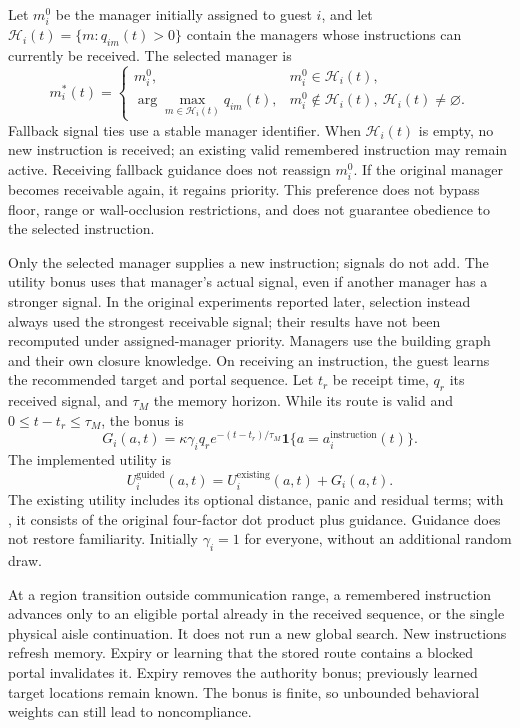 \documentclass[11pt]{article}
\newcommand{\ind}{\mathbf{1}}
\newcommand{\code}[1]{\texttt{\detokenize{#1}}}
\begin{document}
Let $m_i^0$ be the manager initially assigned to guest $i$, and let
$\mathcal H_i(t)=\{m:q_{im}(t)>0\}$ contain the managers whose instructions
can currently be received. The selected manager is
\[
 m_i^*(t)=
 \begin{cases}
 m_i^0,&m_i^0\in\mathcal H_i(t),\\
 \displaystyle\arg\max_{m\in\mathcal H_i(t)}q_{im}(t),
       &m_i^0\notin\mathcal H_i(t),\ \mathcal H_i(t)\ne\varnothing.
 \end{cases}
\]
Fallback signal ties use a stable manager identifier. When $\mathcal H_i(t)$
is empty, no new instruction is received; an existing valid remembered
instruction may remain active. Receiving fallback guidance does not reassign
$m_i^0$. If the original manager becomes receivable again, it regains priority.
This preference does not bypass floor, range or wall-occlusion restrictions,
and does not guarantee obedience to the selected instruction.

Only the selected manager supplies a new instruction; signals do not add.
The utility bonus uses that manager's actual signal, even if another manager
has a stronger signal. In the original experiments reported later, selection
instead always used the strongest receivable signal; their results have not
been recomputed under assigned-manager priority.
Managers use the building graph and their own closure knowledge. On receiving
an instruction, the guest learns the recommended target and portal sequence.
Let $t_r$ be receipt time, $q_r$ its received signal, and $\tau_M$ the memory
horizon. While its route is valid and $0\leq t-t_r\leq\tau_M$, the bonus is
\[
 G_i(a,t)=\kappa\gamma_iq_r e^{-(t-t_r)/\tau_M}
             \ind\{a=a_i^{\mathrm{instruction}}(t)\}.
\]
The implemented utility is
\[
 U_i^{\mathrm{guided}}(a,t)=U_i^{\mathrm{existing}}(a,t)+G_i(a,t).
\]
The existing utility includes its optional distance, panic and residual terms;
with \code{behavioralOnly=true}, it consists of the original four-factor dot
product plus guidance. Guidance does not restore familiarity. Initially
$\gamma_i=1$ for everyone, without an additional random draw.

At a region transition outside communication range, a remembered instruction
advances only to an eligible portal already in the received sequence, or the
single physical aisle continuation. It does not run a new global search.
New instructions refresh memory. Expiry or learning that the stored route
contains a blocked portal invalidates it. Expiry removes the authority bonus;
previously learned target locations remain known. The bonus is finite, so
unbounded behavioral weights can still lead to noncompliance.
\end{document}
